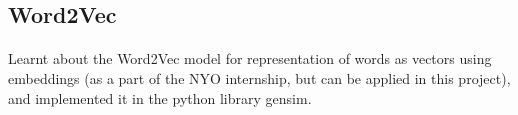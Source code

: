 \documentclass{article}
\begin{document}
        \subsection*{\fontsize{16}{20}\selectfont Word2Vec}
        	\vspace{+1mm}\paragraph{}{\fontsize{13}{16}\selectfont Learnt about the Word2Vec model for representation of words as vectors using embeddings (as a part of the NYO internship, but can be applied in this project), and implemented it in the python library gensim.}\\[-3mm]
        
    
\end{document}

